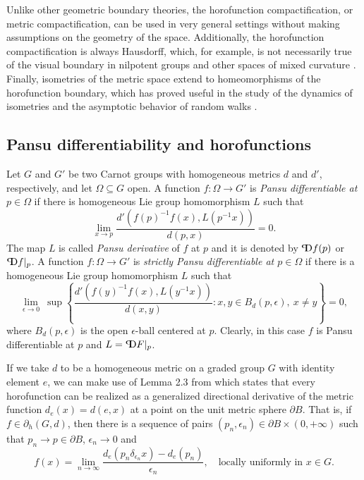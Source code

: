 \documentclass{article}
\theoremstyle{definition}
\newcommand{\bhor}{\partial_h}
\newcommand{\pD}{\text{\scalebox{-1}[1]{$\mathrm{P}$}\!\!$\mathrm{D}$}}
\begin{document}
Unlike other geometric boundary theories, the horofunction compactification, or metric compactification, can be used in very general settings without making assumptions on the geometry of the space. Additionally, the horofunction compactification is always Hausdorff, which, for example, is not necessarily true of the visual boundary in nilpotent groups and other spaces of mixed curvature \cite{FNG}. Finally, isometries of the metric space extend to homeomorphisms of the horofunction boundary, which has proved useful in the study of the dynamics of isometries and the asymptotic behavior of random walks \cite{karlsson-stars, karlsson-ledrappier, karlsson-ledrappier-drift, maher-tiozzo}.



\subsection{Pansu differentiability and horofunctions} \label{sec:Pansudifferentiability}
Let $G$ and $G'$ be two Carnot groups with homogeneous metrics $d$ and $d'$, respectively, and let $\Omega\subseteq G$ open.
A function $f:\Omega\to G'$ is \emph{Pansu differentiable at $p\in\Omega$} if 
there is homogeneous Lie group homomorphism $L$ 
such that
\[
\lim_{x\to p}
	\frac{d'( f(p)^{-1}f(x) , L(p^{-1}x) )}{d(p,x)}
= 0 .
\]
The map $L$ is called \emph{Pansu derivative} of $f$ at $p$ and it is denoted by $\pD f(p)$ or $\pD f|_p$.
A function $f:\Omega\to G'$ is \emph{strictly Pansu differentiable at $p\in\Omega$} if 
there is a homogeneous Lie group homomorphism $L$ 
such that
\[
\lim_{\epsilon\to0}\ \sup \left\{
	\frac{d'( f(y)^{-1}f(x) , L(y^{-1}x) )}{d(x,y)}
	: x,y\in B_d(p,\epsilon),\ x\neq y \right\}
= 0,
\]
where $B_d(p, \epsilon)$ is the open $\epsilon$-ball centered at $p$.
Clearly, in this case $f$ is Pansu differentiable at $p$ and $L=\pD F|_p$.




If we take $d$ to be a homogeneous metric on a graded group $G$ with identity element $e$, we can make use of Lemma 2.3 from \cite{FNG} which states that every horofunction can be realized as a generalized directional derivative of the metric function $d_e(x) = d(e, x)$ at a point on the unit metric sphere $\partial B$. That is,
	if $f\in\bhor(G,d)$, then there is a sequence of pairs $(p_n,\epsilon_n)\in\partial B \times(0,+\infty)$ such that $p_n\to p\in \partial B$, $\epsilon_n\to0$ and
	\begin{equation*}
	f(x) = \lim_{n\to\infty} \frac{d_e(p_n\delta_{\epsilon_n}x)-d_e(p_n)}{\epsilon_n}, 
	\quad\text{locally uniformly in $x\in G$.}
	\end{equation*}
		
\end{document}
